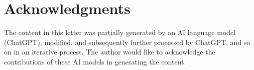\documentclass{article}
\begin{document}
\section{Acknowledgments}
The content in this letter was partially generated by an AI language model (ChatGPT), modified, and subsequently further processed by ChatGPT, and so on in an iterative process. The author would like to acknowledge the contributions of these AI models in generating the content.
\end{document}
